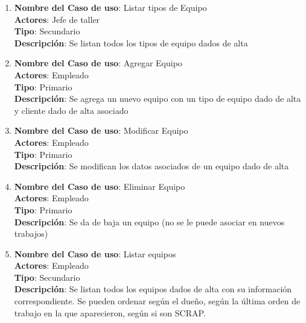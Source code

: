\documentclass[12pt]{extarticle}
\begin{document}
\begin{spacing}{1.2}
\begin{enumerate}
            \item 	\textbf{Nombre del Caso de uso}: Listar tipos de Equipo\\
                    \textbf{Actores}: Jefe de taller\\
                    \textbf{Tipo}: Secundario\\
                    \textbf{Descripción}: Se listan todos los tipos de equipo dados de alta
            
            \item 	\textbf{Nombre del Caso de uso}: Agregar Equipo\\
                    \textbf{Actores}: Empleado\\
                    \textbf{Tipo}: Primario\\
                    \textbf{Descripción}: Se agrega un nuevo equipo con un tipo de equipo dado de alta y cliente dado de alta asociado
            
            \item 	\textbf{Nombre del Caso de uso}: Modificar Equipo\\
                    \textbf{Actores}: Empleado\\
                    \textbf{Tipo}: Primario\\
                    \textbf{Descripción}: Se modifican los datos asociados de un equipo dado de alta
            
            \item 	\textbf{Nombre del Caso de uso}: Eliminar Equipo\\
                    \textbf{Actores}: Empleado\\
                    \textbf{Tipo}: Primario\\
                    \textbf{Descripción}: Se da de baja un equipo (no se le puede asociar en nuevos trabajos)
            
            \item 	\textbf{Nombre del Caso de uso}: Listar equipos\\
                    \textbf{Actores}: Empleado\\
                    \textbf{Tipo}: Secundario\\
                    \textbf{Descripción}: Se listan todos los equipos dados de alta con su información correspondiente. Se pueden ordenar según el dueño, según la última orden de trabajo en la que aparecieron, según si son SCRAP.




\end{enumerate}
\end{spacing}
\end{document}
